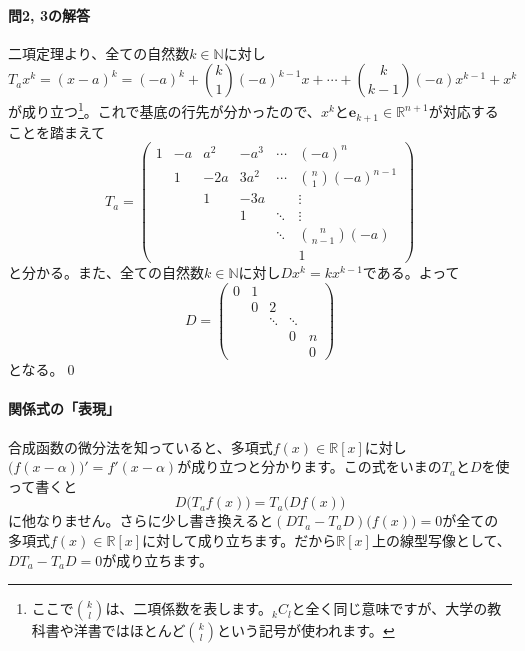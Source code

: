 \paragraph{問2, 3の解答} 二項定理より、全ての自然数$k\in\mathbb{N}$に対し
\[
T_a x^k = (x - a) ^k = (-a)^k + \binom{k}{1} (-a)^{k - 1} x + \cdots + \binom{k}{k - 1} (-a) x^{k - 1} + x^k
\]
が成り立つ\footnote{ここで$\binom{k}{l}$は、二項係数を表します。${}_k C_l$と全く同じ意味ですが、大学の教科書や洋書ではほとんど$\binom{k}{l}$という記号が使われます。}。これで基底の行先が分かったので、$x^k$と$\bm{e}_{k + 1} \in \mathbb{R}^{n + 1}$が対応することを踏まえて
\[
T_a
=
\begin{pmatrix}
1 & -a & a^2 & -a^3 & \cdots & (-a)^n \\
 & 1 & -2a & 3a^2 & \cdots & \binom{n}{1}(-a)^{n - 1} \\
 & & 1 & -3a & & \vdots \\
 & & & 1 & \ddots & \vdots \\
 & & & & \ddots & \binom{n}{n - 1}(-a) \\
 & & & & & 1
\end{pmatrix}
\]
と分かる。また、全ての自然数$k\in\mathbb{N}$に対し$Dx^k = kx^{k - 1}$である。よって
\[
D
=
\begin{pmatrix}
0 & 1 \\
& 0 & 2 \\
& & \ddots & \ddots \\
& & & 0 & n \\
& & & & 0
\end{pmatrix}
\]
となる。\qed

\paragraph{関係式の「表現」} 合成函数の微分法を知っていると、多項式$f(x) \in \mathbb{R}[x]$に対し$\bigl(f(x - \alpha)\bigr)' = f'(x - \alpha)$が成り立つと分かります。この式をいまの$T_a$と$D$を使って書くと
\[
D\bigl(T_a f(x)\bigr) = T_a\bigl( Df(x) \bigr)
\]
に他なりません。さらに少し書き換えると$(D T_a - T_a D)\bigl(f(x)\bigr) = 0$が全ての多項式$f(x) \in \mathbb{R}[x]$に対して成り立ちます。だから$\mathbb{R}[x]$上の線型写像として、$D T_a - T_a D = 0$が成り立ちます。

